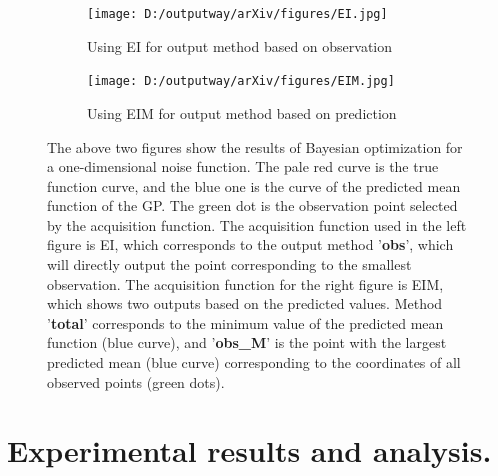 \documentclass{article}
\begin{document}
\begin{figure}[H]
    \centering
    \begin{subfigure}[t]{.48\linewidth}
        \centering
        \texttt{[image: D:/outputway/arXiv/figures/EI.jpg]}
        \caption{Using EI for output method based on observation}
    \end{subfigure}
    \begin{subfigure}[t]{.48\linewidth}
        \centering
        \texttt{[image: D:/outputway/arXiv/figures/EIM.jpg]}
        \caption{Using EIM for output method based on prediction}
    \end{subfigure}
    \caption{The above two figures show the results of Bayesian optimization for a one-dimensional noise function. The pale red curve is the true function curve, and the blue one is the curve of the predicted mean function of the GP. The green dot is the observation point selected by the acquisition function. The acquisition function used in the left figure is EI, which corresponds to the output method '\textbf{obs}', which will directly output the point corresponding to the smallest observation. The acquisition function for the right figure is EIM, which shows two outputs based on the predicted values. Method '\textbf{total}' corresponds to the minimum value of the predicted mean function (blue curve), and '\textbf{obs\_M}' is the point with the largest predicted mean (blue curve) corresponding to the coordinates of all observed points (green dots).}
    \label{Fig1}
\end{figure}




\section{Experimental results and analysis.}
\end{document}
